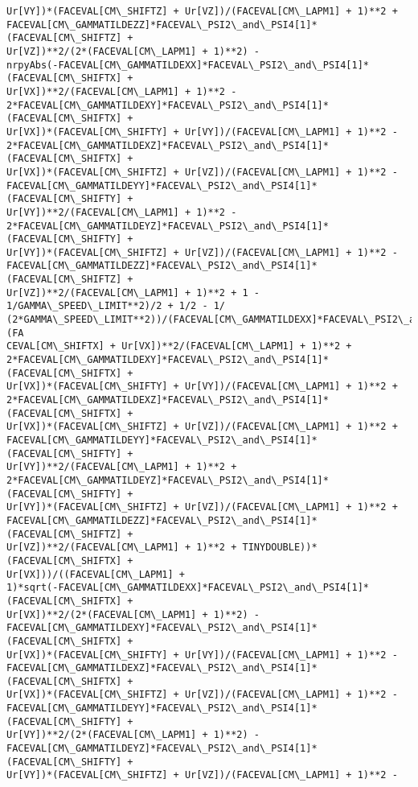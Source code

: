 \documentclass[landscape,letterpaper,10pt,english]{article}
\begin{document}
\begin{Verbatim}[commandchars=\\\{\}]
Ur[VY])*(FACEVAL[CM\_SHIFTZ] + Ur[VZ])/(FACEVAL[CM\_LAPM1] + 1)**2 +
FACEVAL[CM\_GAMMATILDEZZ]*FACEVAL\_PSI2\_and\_PSI4[1]*(FACEVAL[CM\_SHIFTZ] +
Ur[VZ])**2/(2*(FACEVAL[CM\_LAPM1] + 1)**2) -
nrpyAbs(-FACEVAL[CM\_GAMMATILDEXX]*FACEVAL\_PSI2\_and\_PSI4[1]*(FACEVAL[CM\_SHIFTX] +
Ur[VX])**2/(FACEVAL[CM\_LAPM1] + 1)**2 -
2*FACEVAL[CM\_GAMMATILDEXY]*FACEVAL\_PSI2\_and\_PSI4[1]*(FACEVAL[CM\_SHIFTX] +
Ur[VX])*(FACEVAL[CM\_SHIFTY] + Ur[VY])/(FACEVAL[CM\_LAPM1] + 1)**2 -
2*FACEVAL[CM\_GAMMATILDEXZ]*FACEVAL\_PSI2\_and\_PSI4[1]*(FACEVAL[CM\_SHIFTX] +
Ur[VX])*(FACEVAL[CM\_SHIFTZ] + Ur[VZ])/(FACEVAL[CM\_LAPM1] + 1)**2 -
FACEVAL[CM\_GAMMATILDEYY]*FACEVAL\_PSI2\_and\_PSI4[1]*(FACEVAL[CM\_SHIFTY] +
Ur[VY])**2/(FACEVAL[CM\_LAPM1] + 1)**2 -
2*FACEVAL[CM\_GAMMATILDEYZ]*FACEVAL\_PSI2\_and\_PSI4[1]*(FACEVAL[CM\_SHIFTY] +
Ur[VY])*(FACEVAL[CM\_SHIFTZ] + Ur[VZ])/(FACEVAL[CM\_LAPM1] + 1)**2 -
FACEVAL[CM\_GAMMATILDEZZ]*FACEVAL\_PSI2\_and\_PSI4[1]*(FACEVAL[CM\_SHIFTZ] +
Ur[VZ])**2/(FACEVAL[CM\_LAPM1] + 1)**2 + 1 - 1/GAMMA\_SPEED\_LIMIT**2)/2 + 1/2 - 1/
(2*GAMMA\_SPEED\_LIMIT**2))/(FACEVAL[CM\_GAMMATILDEXX]*FACEVAL\_PSI2\_and\_PSI4[1]*(FA
CEVAL[CM\_SHIFTX] + Ur[VX])**2/(FACEVAL[CM\_LAPM1] + 1)**2 +
2*FACEVAL[CM\_GAMMATILDEXY]*FACEVAL\_PSI2\_and\_PSI4[1]*(FACEVAL[CM\_SHIFTX] +
Ur[VX])*(FACEVAL[CM\_SHIFTY] + Ur[VY])/(FACEVAL[CM\_LAPM1] + 1)**2 +
2*FACEVAL[CM\_GAMMATILDEXZ]*FACEVAL\_PSI2\_and\_PSI4[1]*(FACEVAL[CM\_SHIFTX] +
Ur[VX])*(FACEVAL[CM\_SHIFTZ] + Ur[VZ])/(FACEVAL[CM\_LAPM1] + 1)**2 +
FACEVAL[CM\_GAMMATILDEYY]*FACEVAL\_PSI2\_and\_PSI4[1]*(FACEVAL[CM\_SHIFTY] +
Ur[VY])**2/(FACEVAL[CM\_LAPM1] + 1)**2 +
2*FACEVAL[CM\_GAMMATILDEYZ]*FACEVAL\_PSI2\_and\_PSI4[1]*(FACEVAL[CM\_SHIFTY] +
Ur[VY])*(FACEVAL[CM\_SHIFTZ] + Ur[VZ])/(FACEVAL[CM\_LAPM1] + 1)**2 +
FACEVAL[CM\_GAMMATILDEZZ]*FACEVAL\_PSI2\_and\_PSI4[1]*(FACEVAL[CM\_SHIFTZ] +
Ur[VZ])**2/(FACEVAL[CM\_LAPM1] + 1)**2 + TINYDOUBLE))*(FACEVAL[CM\_SHIFTX] +
Ur[VX]))/((FACEVAL[CM\_LAPM1] +
1)*sqrt(-FACEVAL[CM\_GAMMATILDEXX]*FACEVAL\_PSI2\_and\_PSI4[1]*(FACEVAL[CM\_SHIFTX] +
Ur[VX])**2/(2*(FACEVAL[CM\_LAPM1] + 1)**2) -
FACEVAL[CM\_GAMMATILDEXY]*FACEVAL\_PSI2\_and\_PSI4[1]*(FACEVAL[CM\_SHIFTX] +
Ur[VX])*(FACEVAL[CM\_SHIFTY] + Ur[VY])/(FACEVAL[CM\_LAPM1] + 1)**2 -
FACEVAL[CM\_GAMMATILDEXZ]*FACEVAL\_PSI2\_and\_PSI4[1]*(FACEVAL[CM\_SHIFTX] +
Ur[VX])*(FACEVAL[CM\_SHIFTZ] + Ur[VZ])/(FACEVAL[CM\_LAPM1] + 1)**2 -
FACEVAL[CM\_GAMMATILDEYY]*FACEVAL\_PSI2\_and\_PSI4[1]*(FACEVAL[CM\_SHIFTY] +
Ur[VY])**2/(2*(FACEVAL[CM\_LAPM1] + 1)**2) -
FACEVAL[CM\_GAMMATILDEYZ]*FACEVAL\_PSI2\_and\_PSI4[1]*(FACEVAL[CM\_SHIFTY] +
Ur[VY])*(FACEVAL[CM\_SHIFTZ] + Ur[VZ])/(FACEVAL[CM\_LAPM1] + 1)**2 -

\end{Verbatim}
\end{document}
